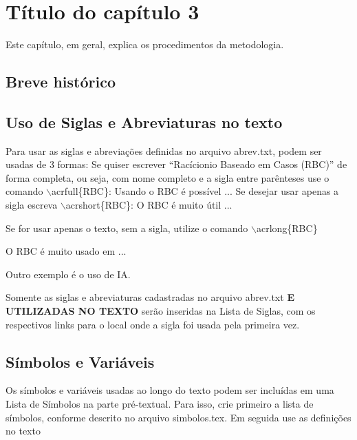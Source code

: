 \chapter{Título do capítulo 3}

Este capítulo, em geral, explica os procedimentos da metodologia.

\section{Breve histórico}

\lipsum[1]

\section{Uso de Siglas e Abreviaturas no texto}
Para usar as siglas e abreviações definidas no arquivo abrev.txt, podem ser usadas de 3 formas:
Se quiser escrever ``Racícionio Baseado em Casos (RBC)'' de forma completa, ou seja, com nome completo e a sigla entre parênteses use o comando $\backslash$acrfull\{RBC\}:
Usando o \acrfull{RBC} é possível ...
Se desejar usar apenas a sigla escreva $\backslash$acrshort\{RBC\}:
O \acrshort{RBC} é muito útil ...

Se for usar apenas o texto, sem a sigla, utilize o comando $\backslash$acrlong\{RBC\}

O \acrlong{RBC} é muito usado em ...

Outro exemplo é o uso de \acrfull{IA}. 


Somente as siglas e abreviaturas cadastradas no arquivo abrev.txt \textbf{E UTILIZADAS NO TEXTO} serão inseridas na Lista de Siglas, com os respectivos links para o local onde a sigla foi usada pela primeira vez.

\section{Símbolos e Variáveis}

Os símbolos e variáveis usadas ao longo do texto podem ser incluídas em uma Lista de Símbolos na parte pré-textual.
Para isso, crie primeiro a lista de símbolos, conforme descrito no arquivo simbolos.tex. Em seguida use as definições no texto 



